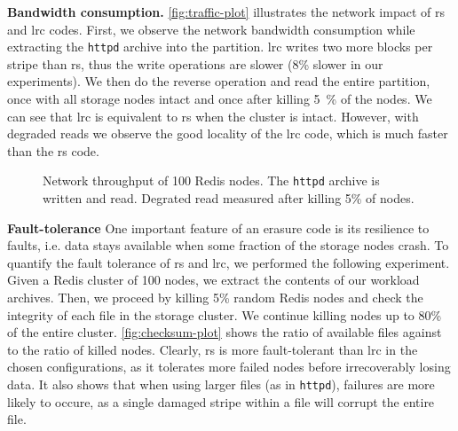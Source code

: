 \textbf{Bandwidth consumption.}
\label{subsec:network-traffic}
\autoref{fig:traffic-plot} illustrates the network impact of \ac{rs} and \ac{lrc} codes. 
First, we observe the network bandwidth consumption while extracting the \texttt{httpd} archive into the \SYS partition. 
\ac{lrc} writes two more blocks per stripe than \ac{rs}, thus the write operations are slower (8\% slower in our experiments). %
We then do the reverse operation and read the entire partition, once with all storage nodes intact and once after killing \SI{5}{\percent} of the nodes. 
We can see that \ac{lrc} is equivalent to \ac{rs} when the cluster is intact. 
However, with degraded reads we observe the good locality of the \ac{lrc} code, which is much faster than the \ac{rs} code. 

\begin{figure*}
    \centering
    
    \caption{Network throughput of 100 Redis nodes. The \texttt{httpd} archive is written and read. Degrated read measured after killing 5\% of nodes.}
    \label{fig:traffic-plot}
\end{figure*}

\textbf{Fault-tolerance}
\label{subsec:fault-tolerance}
One important feature of an erasure code is its resilience to faults, i.e. data stays available when some fraction of the storage nodes crash.
To quantify the fault tolerance of \ac{rs} and \ac{lrc}, we performed the following experiment. 
Given a Redis cluster of 100 nodes, we extract the contents of our workload archives.%
Then, we proceed by killing 5\% random Redis nodes and check the integrity of each file in the storage cluster.
We continue killing nodes up to 80\% of the entire cluster.
\autoref{fig:checksum-plot} shows the ratio of available files against to the ratio of killed nodes.
Clearly, \ac{rs} is more fault-tolerant than \ac{lrc} in the chosen configurations, as it tolerates more failed nodes before irrecoverably losing data.
It also shows that when using larger files (as in \texttt{httpd}), failures are more likely to occure, as a single damaged stripe within a file will corrupt the entire file.

